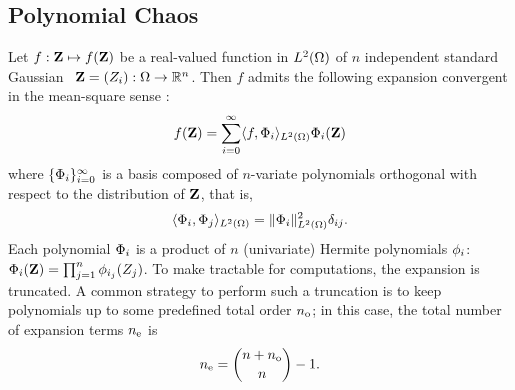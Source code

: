 \subsection{Polynomial Chaos} 
Let $f: \mathbf{Z} \mapsto f(\mathbf{Z})$ be a real-valued function in ${L^{2}(\Omega)}$ of $n$ independent standard Gaussian \rvs\ $\mathbf{Z} = (Z_i): \Omega \to \mathbb{R}^n$. Then $f$ admits the following expansion convergent in the mean-square sense \cite{maitre2010}:
\begin{equation} \elabel{pc-expansion}
  f(\vZ) = \sum_{i = 0}^\infty \iprod{f, \vpcb_i}_\H \vpcb_i(\vZ)
\end{equation}
where $\{ \Phi_i \}_{i = 0}^\infty$ is a basis composed of $n$-variate polynomials orthogonal with respect to the distribution of $\mathbf{Z}$, that is,
\[
  \langle \Phi_i, \Phi_j \rangle_{L^{2}(\Omega)} = \| \Phi_i \|^2_{L^{2}(\Omega)} \delta_{ij}.
\]
Each polynomial $\Phi_i$ is a product of $n$ (univariate) Hermite polynomials $\phi_i$: $\Phi_i(\mathbf{Z}) = \prod_{j = 1}^n \phi_{i_j}(Z_j)$. To make  tractable for computations, the expansion is truncated. A common strategy to perform such a truncation is to keep polynomials up to some predefined total order ${n_\text{o}}$; in this case, the total number of expansion terms ${n_\text{e}}$ is
\[
  {n_\text{e}} = {n + {n_\text{o}} \choose n} - 1.
\]
